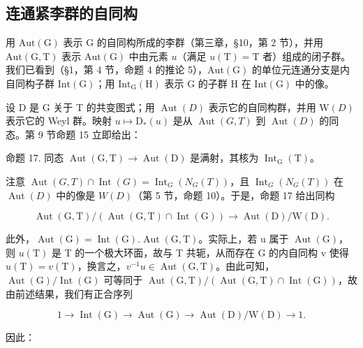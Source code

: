 \subsection{连通紧李群的自同构}

用 \(\mathrm{Aut}(\mathrm{G})\) 表示 G 的自同构所成的李群（第三章，§10，第 2 节），并用 \(\mathrm{Aut}(\mathrm{G},\mathrm{T})\) 表示 \(\mathrm{Aut}(\mathrm{G})\) 中由元素 \(u\)（满足 \(u(\mathrm{T}) = \mathrm{T}\) 者）组成的闭子群。我们已看到（§1，第 4 节，命题 4 的推论 5），\(\mathrm{Aut}(\mathrm{G})\) 的单位元连通分支是内自同构子群 \(\mathrm{Int}(\mathrm{G})\)；用 \(\mathrm{Int}_{\mathrm{G}}(\mathrm{H})\) 表示 G 的子群 H 在 \(\mathrm{Int}(\mathrm{G})\) 中的像。

设 D 是 G 关于 T 的共变图式；用 \(\operatorname{Aut}(D)\) 表示它的自同构群，并用 \(\mathrm{W}(D)\) 表示它的 Weyl 群。映射 \(u \mapsto \mathrm{D}_{*}(u)\) 是从 \(\operatorname{Aut}(G, T)\) 到 \(\operatorname{Aut}(D)\) 的同态。第 9 节命题 15 立即给出：

命题 17. 同态 \(\operatorname{Aut}(\mathrm{G},\mathrm{T})\to \operatorname{Aut}(\mathrm{D})\) 是满射，其核为 \(\operatorname{Int}_{\mathrm{G}}(\mathrm{T})\)。

注意 \(\operatorname{Aut}(G,T) \cap \operatorname{Int}(G) = \operatorname{Int}_{G}(N_{G}(T))\)，且 \(\operatorname{Int}_{G}(N_{G}(T))\) 在 \(\operatorname{Aut}(D)\) 中的像是 \(W(D)\)（第 5 节，命题 10）。于是，命题 17 给出同构

\[
\operatorname{Aut} (\mathrm{G}, \mathrm{T}) / (\operatorname{Aut} (\mathrm{G}, \mathrm{T}) \cap \operatorname{Int} (\mathrm{G})) \rightarrow \operatorname{Aut} (\mathrm{D}) / \mathrm{W} (\mathrm{D}).
\]

此外，\(\operatorname{Aut}(\mathrm{G}) = \operatorname{Int}(\mathrm{G}).\operatorname{Aut}(\mathrm{G}, \mathrm{T})\)。实际上，若 u 属于 \(\operatorname{Aut}(\mathrm{G})\)，则 \(u(\mathrm{T})\) 是 T 的一个极大环面，故与 T 共轭，从而存在 G 的内自同构 v 使得 \(u(\mathrm{T}) = v(\mathrm{T})\)，换言之，\(v^{-1}u \in \operatorname{Aut}(\mathrm{G}, \mathrm{T})\)。由此可知，\(\operatorname{Aut}(\mathrm{G})/\operatorname{Int}(\mathrm{G})\) 可等同于 \(\operatorname{Aut}(\mathrm{G}, \mathrm{T})/(\operatorname{Aut}(\mathrm{G}, \mathrm{T}) \cap \operatorname{Int}(\mathrm{G}))\)，故由前述结果，我们有正合序列

\[
1 \to \operatorname{Int} (\mathrm{G}) \to \operatorname{Aut} (\mathrm{G}) \to \operatorname{Aut} (\mathrm{D}) / \mathrm{W} (\mathrm{D}) \to 1.\tag{16}
\]

因此：

